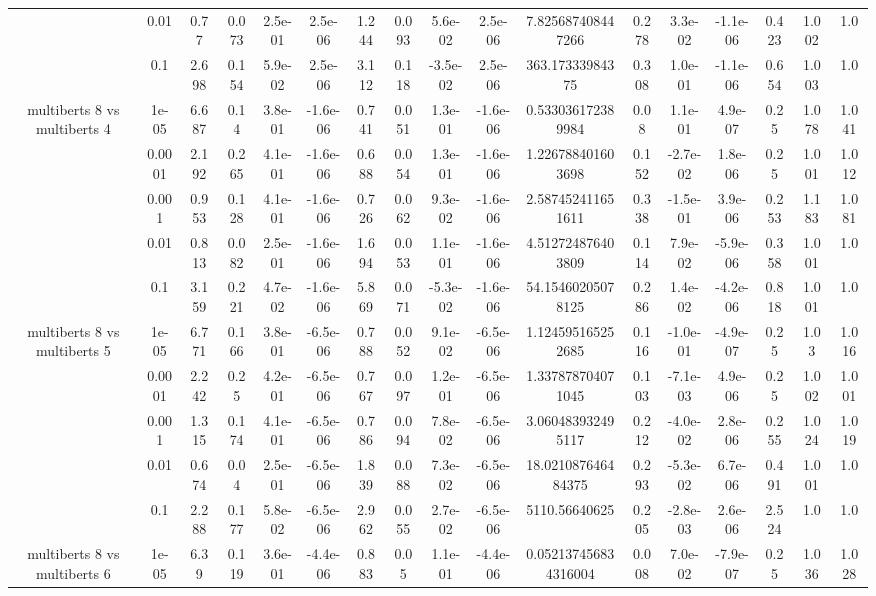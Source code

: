 \begin{tabular}{|c|c|c|c|c|c|c|c|c|c|c|c|c|c|c|c|c|}
 & 0.01 & 0.77 & 0.073 & 2.5e-01 & 2.5e-06 & 1.244 & 0.093 & 5.6e-02 & 2.5e-06 & 7.825687408447266 & 0.278 & 3.3e-02 & -1.1e-06 & 0.423 & 1.002 & 1.0 \\
 & 0.1 & 2.698 & 0.154 & 5.9e-02 & 2.5e-06 & 3.112 & 0.118 & -3.5e-02 & 2.5e-06 & 363.17333984375 & 0.308 & 1.0e-01 & -1.1e-06 & 0.654 & 1.003 & 1.0 \\
\hline
\multirow{5}{*}{multiberts 8 vs multiberts 4} & 1e-05 & 6.687 & 0.14 & 3.8e-01 & -1.6e-06 & 0.741 & 0.051 & 1.3e-01 & -1.6e-06 & 0.533036172389984 & 0.08 & 1.1e-01 & 4.9e-07 & 0.25 & 1.078 & 1.041 \\
 & 0.0001 & 2.192 & 0.265 & 4.1e-01 & -1.6e-06 & 0.688 & 0.054 & 1.3e-01 & -1.6e-06 & 1.226788401603698 & 0.152 & -2.7e-02 & 1.8e-06 & 0.25 & 1.001 & 1.012 \\
 & 0.001 & 0.953 & 0.128 & 4.1e-01 & -1.6e-06 & 0.726 & 0.062 & 9.3e-02 & -1.6e-06 & 2.587452411651611 & 0.338 & -1.5e-01 & 3.9e-06 & 0.253 & 1.183 & 1.081 \\
 & 0.01 & 0.813 & 0.082 & 2.5e-01 & -1.6e-06 & 1.694 & 0.053 & 1.1e-01 & -1.6e-06 & 4.512724876403809 & 0.114 & 7.9e-02 & -5.9e-06 & 0.358 & 1.001 & 1.0 \\
 & 0.1 & 3.159 & 0.221 & 4.7e-02 & -1.6e-06 & 5.869 & 0.071 & -5.3e-02 & -1.6e-06 & 54.15460205078125 & 0.286 & 1.4e-02 & -4.2e-06 & 0.818 & 1.001 & 1.0 \\
\hline
\multirow{5}{*}{multiberts 8 vs multiberts 5} & 1e-05 & 6.771 & 0.166 & 3.8e-01 & -6.5e-06 & 0.788 & 0.052 & 9.1e-02 & -6.5e-06 & 1.124595165252685 & 0.116 & -1.0e-01 & -4.9e-07 & 0.25 & 1.03 & 1.016 \\
 & 0.0001 & 2.242 & 0.25 & 4.2e-01 & -6.5e-06 & 0.767 & 0.097 & 1.2e-01 & -6.5e-06 & 1.337878704071045 & 0.103 & -7.1e-03 & 4.9e-06 & 0.25 & 1.002 & 1.001 \\
 & 0.001 & 1.315 & 0.174 & 4.1e-01 & -6.5e-06 & 0.786 & 0.094 & 7.8e-02 & -6.5e-06 & 3.060483932495117 & 0.212 & -4.0e-02 & 2.8e-06 & 0.255 & 1.024 & 1.019 \\
 & 0.01 & 0.674 & 0.04 & 2.5e-01 & -6.5e-06 & 1.839 & 0.088 & 7.3e-02 & -6.5e-06 & 18.021087646484375 & 0.293 & -5.3e-02 & 6.7e-06 & 0.491 & 1.001 & 1.0 \\
 & 0.1 & 2.288 & 0.177 & 5.8e-02 & -6.5e-06 & 2.962 & 0.055 & 2.7e-02 & -6.5e-06 & 5110.56640625 & 0.205 & -2.8e-03 & 2.6e-06 & 2.524 & 1.0 & 1.0 \\
\hline
\multirow{5}{*}{multiberts 8 vs multiberts 6} & 1e-05 & 6.39 & 0.119 & 3.6e-01 & -4.4e-06 & 0.883 & 0.05 & 1.1e-01 & -4.4e-06 & 0.052137456834316004 & 0.008 & 7.0e-02 & -7.9e-07 & 0.25 & 1.036 & 1.028 \\

\end{tabular}
